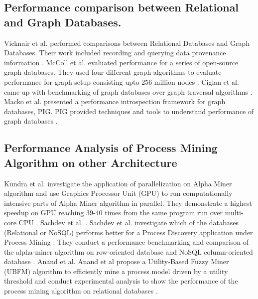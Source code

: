 \documentclass[11pt]{article}
\begin{document}
\normalfont \subsection {\normalfont \textbf{Performance comparison between Relational and Graph Databases.}}
\par{Vicknair et al. performed comparisons between Relational Databases and Graph Databases. Their work included recording and querying data provenance information \cite{vicknair}. McColl et al. evaluated performance for a series of open-source graph databases. They used four different graph algorithms to evaluate performance for graph setup consisting upto 256 million nodes \cite{mccoll}. Ciglan et al. came up with benchmarking of graph databases over graph traversal algorithms \cite{ciglan}. Macko et al. presented a  performance introspection framework for graph databases, PIG. PIG provided techniques and tools to understand performance of graph databases \cite{macko}.}
\normalfont \subsection {\normalfont \textbf{Performance Analysis of Process Mining Algorithm on other Architecture}}
\par{Kundra et al. investigate the application of parallelization on Alpha Miner algorithm and use Graphics Processor Unit (GPU) to run computationally intensive parts of Alpha Miner algorithm in parallel. They demonstrate a highest speedup on GPU reaching 39-40 times from the same program run over multi-core CPU \cite{ kundra2016}. Sachdev et al. \cite{ sachdev2015}. Sachdev et al. investigate which of the databases (Relational or NoSQL) performs better for a Process Discovery application under Process Mining \cite{sachdev2015}. They conduct a performance benchmarking and comparison of the alpha-miner algorithm on row-oriented database and NoSQL column-oriented database \cite{sachdev2015}\cite{gupta2015}. Anand et al. Anand et al propose a Utility-Based Fuzzy Miner (UBFM) algorithm to efficiently mine a process model driven by a utility threshold and conduct experimental analysis to show the performance of the process mining algorithm on relational databases \cite{ anand2015}.}
\end{document}
